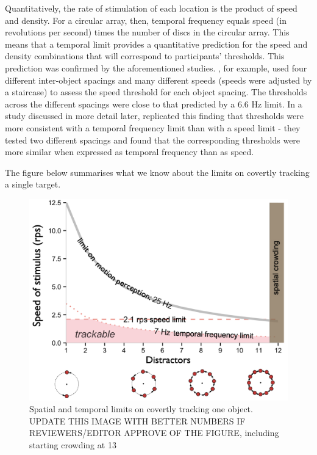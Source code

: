 \documentclass[
]{book}
\begin{document}
Quantitatively, the rate of stimulation of each location is the product of speed and density. For a circular array, then, temporal frequency equals speed (in revolutions per second) times the number of discs in the circular array. This means that a temporal limit provides a quantitative prediction for the speed and density combinations that will correspond to participants' thresholds. This prediction was confirmed by the aforementioned studies. \citet{holcombeSplittingAttentionReduces2013}, for example, used four different inter-object spacings and many different speeds (speeds were adjusted by a staircase) to assess the speed threshold for each object spacing. The thresholds across the different spacings were close to that predicted by a 6.6 Hz limit. In a study discussed in more detail later, \citet{roudaiaDifferentEffectsAging2017} replicated this finding that thresholds were more consistent with a temporal frequency limit than with a speed limit - they tested two different spacings and found that the corresponding thresholds were more similar when expressed as temporal frequency than as speed.

The figure below summarises what we know about the limits on covertly tracking a single target.

\begin{figure}
\includegraphics[width=1\linewidth]{imagesForRmd/trackingLimitsMotionLimitSchematic} \caption{Spatial and temporal limits on covertly tracking one object. UPDATE THIS IMAGE WITH BETTER NUMBERS IF REVIEWERS/EDITOR APPROVE OF THE FIGURE, including starting crowding at 13}\label{fig:singleTargetLimits}
\end{figure}
\end{document}
